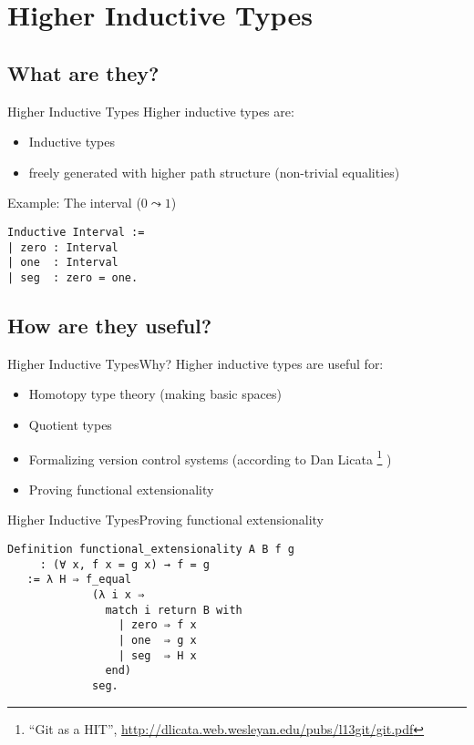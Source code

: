 \documentclass{beamer}
\begin{document}
\section{Higher Inductive Types}
\subsection{What are they?}

\begin{frame}[fragile]{Higher Inductive Types}
  \Large
  Higher inductive types are: \pause
  \begin{itemize}
    \item Inductive types \pause
    \item freely generated with higher path structure (non-trivial equalities) \pause
  \end{itemize}
  Example: The interval ($0 \leadsto 1$) \pause
\begin{verbatim}
Inductive Interval :=
| zero : Interval
| one  : Interval
| seg  : zero = one. 
\end{verbatim}
\end{frame}

\subsection{How are they useful?}

\begin{frame}[fragile]{Higher Inductive Types}{Why?}
  \Large
  Higher inductive types are useful for: \pause
  \begin{itemize}
    \item Homotopy type theory (making basic spaces)\pause
    \item Quotient types \pause
    \item Formalizing version control systems (according to Dan Licata%
    \footnote<4->{``Git as a HIT'', \url{http://dlicata.web.wesleyan.edu/pubs/l13git/git.pdf}}%
    ) \pause
    \item Proving functional extensionality
  \end{itemize}
\end{frame}

\begin{frame}[fragile]{Higher Inductive Types}{Proving functional extensionality}
  \Large
\begin{verbatim}
Definition functional_extensionality A B f g
     : (∀ x, f x = g x) → f = g
   := λ H ⇒ f_equal
             (λ i x ⇒
               match i return B with
                 | zero ⇒ f x
                 | one  ⇒ g x
                 | seg  ⇒ H x
               end)
             seg.
\end{verbatim}
\end{frame}
\end{document}
